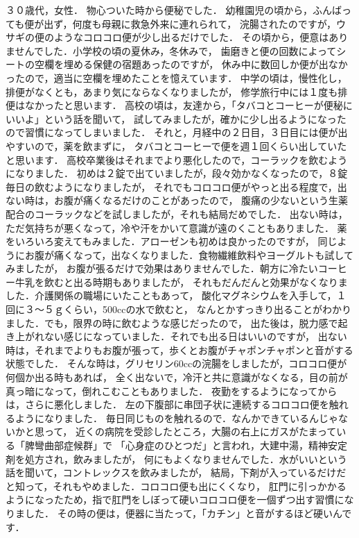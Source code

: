３０歳代，女性．
物心ついた時から便秘でした．
幼稚園児の頃から，ふんばっても便が出ず，何度も母親に救急外来に連れられて，
浣腸されたのですが，ウサギの便のようなコロコロ便が少し出るだけでした．
その頃から，便意はありませんでした．小学校の頃の夏休み，冬休みで，
歯磨きと便の回数によってシートの空欄を埋める保健の宿題あったのですが，
休み中に数回しか便が出なかったので，適当に空欄を埋めたことを憶えています．
中学の頃は，慢性化し，排便がなくとも，あまり気にならなくなりましたが，
修学旅行中には１度も排便はなかったと思います．
高校の頃は，友達から，「タバコとコーヒーが便秘にいいよ」という話を聞いて，
試してみましたが，確かに少し出るようになったので習慣になってしまいました．
それと，月経中の２日目，３日目には便が出やすいので，薬を飲まずに，
タバコとコーヒーで便を週１回くらい出していたと思います．
高校卒業後はそれまでより悪化したので，コーラックを飲むようになりました．
初めは２錠で出ていましたが，段々効かなくなったので，８錠毎日の飲むようになりましたが，
それでもコロコロ便がやっと出る程度で，出ない時は，お腹が痛くなるだけのことがあったので，
腹痛の少ないという生薬配合のコーラックなどを試しましたが，それも結局だめでした．
出ない時は，ただ気持ちが悪くなって，冷や汗をかいて意識が遠のくこともありました．
薬をいろいろ変えてもみました．アローゼンも初めは良かったのですが，
同じようにお腹が痛くなって，出なくなりました．食物繊維飲料やヨーグルトも試してみましたが，
お腹が張るだけで効果はありませんでした．朝方に冷たいコーヒー牛乳を飲むと出る時期もありましたが，
それもだんだんと効果がなくなりました．介護関係の職場にいたこともあって，
酸化マグネシウムを入手して，１回に３～５ｇくらい，500ccの水で飲むと，
なんとかすっきり出ることがわかりました．でも，限界の時に飲むような感じだったので，
出た後は，脱力感で起き上がれない感じになっていました．それでも出る日はいいのですが，
出ない時は，それまでよりもお腹が張って，歩くとお腹がチャポンチャポンと音がする状態でした．
そんな時は，グリセリン60ccの浣腸をしましたが，コロコロ便が何個か出る時もあれば，
全く出ないで，冷汗と共に意識がなくなる，目の前が真っ暗になって，倒れこむこともありました．
夜勤をするようになってからは，さらに悪化しました．
左の下腹部に串団子状に連続するコロコロ便を触れるようになりました．
毎日同じものを触れるので．なんかできているんじゃないかと思って，
近くの病院を受診したところ，大腸の右上にガスがたまっている「脾彎曲部症候群」で
「心身症のひとつだ」と言われ，大建中湯，精神安定剤を処方され，飲みましたが，
何にもよくなりませんでした．水がいいという話を聞いて，コントレックスを飲みましたが，
結局，下剤が入っているだけだと知って，それもやめました．コロコロ便も出にくくなり，
肛門に引っかかるようになったため，指で肛門をしぼって硬いコロコロ便を一個ずつ出す習慣になりました．
その時の便は，便器に当たって，「カチン」と音がするほど硬いんです． 


